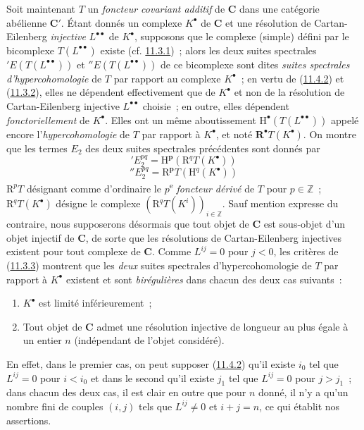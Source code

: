 \begin{env}[11.4.3]
\label{0.11.4.3-fr}
Soit maintenant $T$ un \emph{foncteur covariant additif} de $\boldsymbol{C}$
dans une catégorie abélienne $\boldsymbol{C}'$. Étant donnés un complexe
$K^\bullet$ de $\boldsymbol{C}$ et une résolution de Cartan-Eilenberg \emph{injective}
$L^{\bullet\bullet}$ de $K^\bullet$, supposons que le complexe (simple) défini
par le bicomplexe $T(L^{\bullet\bullet})$ existe
(cf. \hyperref[0.11.3.1-fr]{11.3.1})~; alors les deux suites spectrales
$'E(T(L^{\bullet\bullet}))$ et $''E(T(L^{\bullet\bullet}))$ de ce bicomplexe
sont dites \emph{suites spectrales d'hypercohomologie} de $T$ par rapport au
complexe $K^\bullet$~; en vertu de
(\hyperref[0.11.4.2-fr]{11.4.2}) et
(\hyperref[0.11.3.2-fr]{11.3.2}), elles ne dépendent effectivement que de
$K^\bullet$ et non de la résolution de Cartan-Eilenberg injective
$L^{\bullet\bullet}$ choisie~; en outre, elles dépendent
\emph{fonctoriellement} de $K^\bullet$. Elles ont un même aboutissement
$\mathrm H^\bullet(T(L^{\bullet\bullet}))$ appelé encore
l'\emph{hypercohomologie} de $T$ par rapport à $K^\bullet$, et noté
$\mathbf R^\bullet T(K^\bullet)$. On montre que les termes $E_2$ des deux
suites spectrales précédentes sont donnés par
\[
  \label{0.11.4.3.1-fr}
  'E_2^{pq}=\mathrm H^{\boldsymbol{p}}(\mathrm R^qT(K^\bullet))
  \tag{11.4.3.1}
\]
\[
  \label{0.11.4.3.2-fr}
  ''E_2^{pq}=\mathrm R^{\boldsymbol{p}}T(\mathrm H^q(K^\bullet))
  \tag{11.4.3.2}
\]
$\mathrm R^pT$ désignant comme d'ordinaire le $p$\textsuperscript{e} \emph{foncteur
dérivé} de $T$ pour $p\in\mathbb Z$~; $\mathrm R^qT(K^\bullet)$ désigne le
complexe $(\mathrm R^qT(K^i))_{i\in\mathbb Z}$.
\label{0.11.4.4-fr}Sauf mention expresse du contraire, nous supposerons désormais que tout objet
de $\boldsymbol{C}$ est sous-objet d'un objet injectif de $\boldsymbol{C}$, de sorte
que les résolutions de Cartan-Eilenberg injectives existent pour tout complexe
de $\boldsymbol{C}$. Comme $L^{ij}=0$ pour $j<0$, les critères de
(\hyperref[0.11.3.3-fr]{11.3.3}) montrent que les \emph{deux} suites
spectrales d'hypercohomologie de $T$ par rapport à $K^\bullet$ existent et
sont \emph{birégulières} dans chacun des deux cas suivants~:
\begin{enumerate}
  \item[$1^\circ$] $K^\bullet$ est limité inférieurement~;
  \item[$2^\circ$] Tout objet de $\boldsymbol{C}$ admet une résolution injective
    de longueur au plus égale à un entier $n$ (indépendant de l'objet
    considéré).
\end{enumerate}
En effet, dans le premier cas, on peut supposer
(\hyperref[0.11.4.2-fr]{11.4.2}) qu'il existe $i_0$ tel que $L^{ij}=0$ pour
$i<i_0$ et dans le second qu'il existe $j_1$ tel que $L^{ij}=0$ pour $j>j_1$~;
dans chacun des deux cas, il est clair en outre que pour $n$ donné, il n'y a
qu'un nombre fini de couples $(i,j)$ tels que $L^{ij}\neq0$ et $i+j=n$, ce
qui établit nos assertions.


\end{env}
